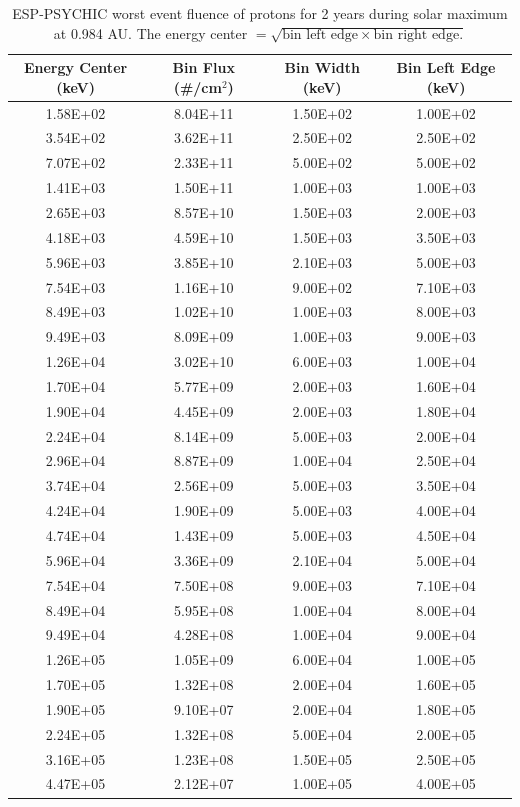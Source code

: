 \documentclass{hitec}
\begin{document}
\begin{table}[!h]\centering
	\caption{ESP-PSYCHIC worst event fluence of protons for 2 years during solar maximum at 0.984 AU. The energy center $=\sqrt{\text{bin left edge}\times\text{bin right edge}.}$ }\label{tab:ESP-PSYCHIC_2-year_subL1}
	\begin{tabular}{|c | c | c | c |}\hline
		Energy Center (keV) & Bin Flux (\#/cm$^2$) & Bin Width (keV) & Bin Left Edge (keV) \\\hline

1.58E+02&8.04E+11&1.50E+02&1.00E+02\\\hline
3.54E+02&3.62E+11&2.50E+02&2.50E+02\\\hline
7.07E+02&2.33E+11&5.00E+02&5.00E+02\\\hline
1.41E+03&1.50E+11&1.00E+03&1.00E+03\\\hline
2.65E+03&8.57E+10&1.50E+03&2.00E+03\\\hline
4.18E+03&4.59E+10&1.50E+03&3.50E+03\\\hline
5.96E+03&3.85E+10&2.10E+03&5.00E+03\\\hline
7.54E+03&1.16E+10&9.00E+02&7.10E+03\\\hline
8.49E+03&1.02E+10&1.00E+03&8.00E+03\\\hline
9.49E+03&8.09E+09&1.00E+03&9.00E+03\\\hline
1.26E+04&3.02E+10&6.00E+03&1.00E+04\\\hline
1.70E+04&5.77E+09&2.00E+03&1.60E+04\\\hline
1.90E+04&4.45E+09&2.00E+03&1.80E+04\\\hline
2.24E+04&8.14E+09&5.00E+03&2.00E+04\\\hline
2.96E+04&8.87E+09&1.00E+04&2.50E+04\\\hline
3.74E+04&2.56E+09&5.00E+03&3.50E+04\\\hline
4.24E+04&1.90E+09&5.00E+03&4.00E+04\\\hline
4.74E+04&1.43E+09&5.00E+03&4.50E+04\\\hline
5.96E+04&3.36E+09&2.10E+04&5.00E+04\\\hline
7.54E+04&7.50E+08&9.00E+03&7.10E+04\\\hline
8.49E+04&5.95E+08&1.00E+04&8.00E+04\\\hline
9.49E+04&4.28E+08&1.00E+04&9.00E+04\\\hline
1.26E+05&1.05E+09&6.00E+04&1.00E+05\\\hline
1.70E+05&1.32E+08&2.00E+04&1.60E+05\\\hline
1.90E+05&9.10E+07&2.00E+04&1.80E+05\\\hline
2.24E+05&1.32E+08&5.00E+04&2.00E+05\\\hline
3.16E+05&1.23E+08&1.50E+05&2.50E+05\\\hline
4.47E+05&2.12E+07&1.00E+05&4.00E+05\\\hline
	\end{tabular}
\end{table}
\clearpage %
\end{document}
